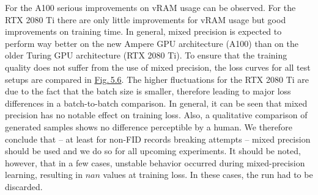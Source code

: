 For the A100 serious improvements on vRAM usage can be observed. For the RTX 2080 Ti there are only little improvements for vRAM usage but good improvements on training time. In general, mixed precision is expected to perform way better on the new Ampere GPU
architecture (A100) than on the older Turing GPU architecture (RTX 2080 Ti). To ensure that the training quality does not suffer from the use of mixed precision, the loss curves for all test setups are compared in \hyperref[fig:5.6]{Fig.\,5.6}. The higher fluctuations for the RTX 2080 Ti are due to the fact that the batch size is smaller, therefore leading to major loss differences in a batch-to-batch comparison. In general, it can be seen that mixed precision has no notable effect on training loss. Also, a qualitative comparison of generated samples shows no difference perceptible by a human. We therefore conclude that – at least for non-FID records breaking attempts – mixed precision should be used and we do so for all upcoming experiments. It should be noted, however, that in a few cases, unstable behavior occurred during mixed-precision learning, resulting in $nan$ values at training loss. In these cases, the run had to be discarded.
%
